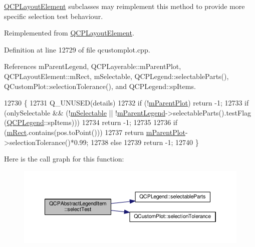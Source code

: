 \hyperlink{class_q_c_p_layout_element}{Q\+C\+P\+Layout\+Element} subclasses may reimplement this method to provide more specific selection test behaviour. 

Reimplemented from \hyperlink{class_q_c_p_layout_element_a9fcf5d0ea19f2c23b2b528bce2c6f095}{Q\+C\+P\+Layout\+Element}.



Definition at line 12729 of file qcustomplot.\+cpp.



References m\+Parent\+Legend, Q\+C\+P\+Layerable\+::m\+Parent\+Plot, Q\+C\+P\+Layout\+Element\+::m\+Rect, m\+Selectable, Q\+C\+P\+Legend\+::selectable\+Parts(), Q\+Custom\+Plot\+::selection\+Tolerance(), and Q\+C\+P\+Legend\+::sp\+Items.


\begin{DoxyCode}
12730 \{
12731   Q\_UNUSED(details)
12732   if (!\hyperlink{class_q_c_p_layerable_aa2a528433e44db02b8aef23c1f9f90ed}{mParentPlot}) return -1;
12733   if (onlySelectable && (!\hyperlink{class_q_c_p_abstract_legend_item_aa84029f57b1b32f642fb7db63c3fc2c2}{mSelectable} || !\hyperlink{class_q_c_p_abstract_legend_item_aafcd9fc6fcb10f4a8d46037011afafe8}{mParentLegend}->selectableParts().testFlag
      (\hyperlink{class_q_c_p_legend}{QCPLegend}::spItems)))
12734     return -1;
12735   
12736   if (\hyperlink{class_q_c_p_layout_element_ad8896f05550389f7b9e92c9e6cdf6e01}{mRect}.contains(pos.toPoint()))
12737     return \hyperlink{class_q_c_p_layerable_aa2a528433e44db02b8aef23c1f9f90ed}{mParentPlot}->selectionTolerance()*0.99;
12738   else
12739     return -1;
12740 \}
\end{DoxyCode}


Here is the call graph for this function\+:\nopagebreak
\begin{figure}[H]
\begin{center}
\leavevmode
\includegraphics[width=350pt]{class_q_c_p_abstract_legend_item_ad0480d5cad34627a294a2921caa4a62f_cgraph}
\end{center}
\end{figure}


